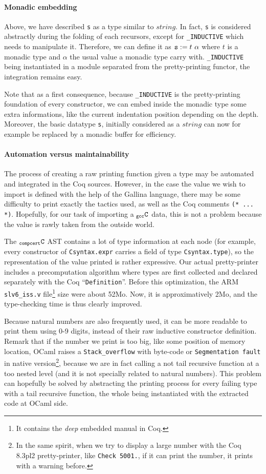 \documentclass[a4paper, 11pt]{article}
\newcommand{\coqc}{Coq 8.3pl2\xspace}
\newcommand{\C}{$_{\tt compcert}{\tt C}$\xspace}
\newcommand{\gccC}{$_{\tt gcc}{\tt C}$\xspace}
\newcommand{\outworld}{the outside world\xspace}
\begin{document}
\paragraph{Monadic embedding}
Above, we have described \verb|s| as a type similar to $string$. In fact, \verb|s| is considered abstractly during the folding of each recursors, except for \verb|_INDUCTIVE| which needs to manipulate it. Therefore, we can define it as $\verb|s| := t~\alpha$ where $t$ is a monadic type and $\alpha$ the usual value a monadic type carry with. \verb|_INDUCTIVE| being instantiated in a module separated from the pretty-printing functor, the integration remains easy.

Note that as a first consequence, because \verb|_INDUCTIVE| is the pretty-printing foundation of every constructor, we can embed inside the monadic type some extra informations, like the current indentation position depending on the depth. Moreover, the basic datatype \verb|s|, initially considered as a $string$ can now for example be replaced by a monadic buffer for efficiency.

\paragraph{Automation versus maintainability}
The process of creating a raw printing function given a type may be automated and integrated in the Coq sources. However, in the case the value we wish to import is defined with the help of the Gallina language, there may be some difficulty to print exactly the tactics used, as well as the Coq comments \verb|(* ... *)|. Hopefully, for our task of importing a \gccC data, this is not a problem because the value is rawly taken from \outworld.

The \C AST contains a lot of type information at each node (for example, every constructor of \verb|Csyntax.expr| carries a field of type \verb|Csyntax.type|), so the representation of the value printed is rather expressive. Our actual pretty-printer includes a precomputation algorithm where types are first collected and declared separately with the Coq ``\verb|Definition|''.
Before this optimization, the ARM {\tt slv6\_iss.v} file\footnote{It contains the \emph{deep} embedded manual in Coq.} size were about 52Mo. Now, it is approximatively 2Mo, and the type-checking time is thus clearly improved.

Because natural numbers are also frequently used, it can be more readable to print them using 0-9 digits, instead of their raw inductive constructor definition. Remark that if the number we print is too big, like some position of memory location, OCaml raises a \verb|Stack_overflow| with byte-code or \verb|Segmentation fault| in native version\footnote{In the same spirit, when we try to display a large number with the \coqc pretty-printer, like {\tt Check 5001.}, if it can print the number, it prints with a warning before.}, because we are in fact calling a not tail recursive function at a too nested level (and it is not specially related to natural numbers). This problem can hopefully be solved by abstracting the printing process for every failing type with a tail recursive function, the whole being instantiated with the extracted code at OCaml side.
\end{document}
